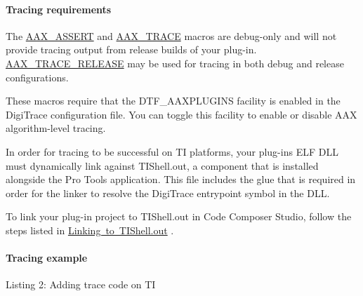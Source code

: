 \hypertarget{a00832_subsubsection__tracing_requirements_}{}\paragraph{Tracing requirements}\label{a00832_subsubsection__tracing_requirements_}

\begin{DoxyItemize}
\item The \mbox{\hyperlink{a00395_a168ee44fd7a5485ab50160db36fb2988}{A\+A\+X\+\_\+\+A\+S\+S\+E\+RT}} and \mbox{\hyperlink{a00395_ab53f1d6a94f8b6ebb3a101f71bfe4e82}{A\+A\+X\+\_\+\+T\+R\+A\+CE}} macros are debug-\/only and will not provide tracing output from release builds of your plug-\/in. \mbox{\hyperlink{a00395_ac2aa820ece56bb59140ad561218db4b3}{A\+A\+X\+\_\+\+T\+R\+A\+C\+E\+\_\+\+R\+E\+L\+E\+A\+SE}} may be used for tracing in both debug and release configurations.  
\item These macros require that the {\ttfamily D\+T\+F\+\_\+\+A\+A\+X\+P\+L\+U\+G\+I\+NS} facility is enabled in the Digi\+Trace configuration file. You can toggle this facility to enable or disable A\+AX algorithm-\/level tracing.  
\item In order for tracing to be successful on TI platforms, your plug-\/in\textquotesingle{}s E\+LF D\+LL must dynamically link against T\+I\+Shell.\+out, a component that is installed alongside the Pro Tools application. This file includes the \textquotesingle{}glue\textquotesingle{} that is required in order for the linker to resolve the Digi\+Trace entrypoint symbol in the D\+LL.  
\end{DoxyItemize}

To link your plug-\/in project to T\+I\+Shell.\+out in Code Composer Studio, follow the steps listed in \mbox{\hyperlink{a00832_subsubsection__linking_to_tishellout_}{Linking to T\+I\+Shell.\+out}} .

\hypertarget{a00832_subsubsection__tracing_example_}{}\paragraph{Tracing example}\label{a00832_subsubsection__tracing_example_}



\begin{DoxyCode}{0}
\DoxyCodeLine{\{}
\DoxyCodeLine{      \textcolor{stringliteral}{"MyExamplePlugIn\_AlgorithmInit called for action : \%d"},}
\DoxyCodeLine{\} }
\end{DoxyCode}
  Listing 2\+: Adding trace code on TI

